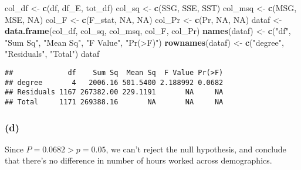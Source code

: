 \documentclass[]{article}
\newenvironment{Shaded}{\begin{snugshade}}{\end{snugshade}}
\newcommand{\KeywordTok}[1]{\textcolor[rgb]{0.13,0.29,0.53}{\textbf{#1}}}
\newcommand{\StringTok}[1]{\textcolor[rgb]{0.31,0.60,0.02}{#1}}
\newcommand{\OtherTok}[1]{\textcolor[rgb]{0.56,0.35,0.01}{#1}}
\newcommand{\NormalTok}[1]{#1}
\begin{document}
\begin{Shaded}
\begin{Highlighting}[]
\NormalTok{col_df <-}\StringTok{ }\KeywordTok{c}\NormalTok{(df, df_E, tot_df)}
\NormalTok{col_sq <-}\StringTok{ }\KeywordTok{c}\NormalTok{(SSG, SSE, SST)}
\NormalTok{col_msq <-}\StringTok{ }\KeywordTok{c}\NormalTok{(MSG, MSE, }\OtherTok{NA}\NormalTok{)}
\NormalTok{col_F <-}\StringTok{ }\KeywordTok{c}\NormalTok{(F_stat, }\OtherTok{NA}\NormalTok{, }\OtherTok{NA}\NormalTok{)}
\NormalTok{col_Pr <-}\StringTok{ }\KeywordTok{c}\NormalTok{(Pr, }\OtherTok{NA}\NormalTok{, }\OtherTok{NA}\NormalTok{)}
\NormalTok{dataf <-}\StringTok{ }\KeywordTok{data.frame}\NormalTok{(col_df, col_sq, col_msq, col_F, col_Pr)}
\KeywordTok{names}\NormalTok{(dataf) <-}\StringTok{ }\KeywordTok{c}\NormalTok{(}\StringTok{"df"}\NormalTok{, }\StringTok{"Sum Sq"}\NormalTok{, }\StringTok{"Mean Sq"}\NormalTok{, }\StringTok{"F Value"}\NormalTok{, }\StringTok{"Pr(>F)"}\NormalTok{)}
\KeywordTok{rownames}\NormalTok{(dataf) <-}\StringTok{ }\KeywordTok{c}\NormalTok{(}\StringTok{"degree"}\NormalTok{, }\StringTok{"Residuals"}\NormalTok{, }\StringTok{"Total"}\NormalTok{)}
\NormalTok{dataf}
\end{Highlighting}
\end{Shaded}

\begin{verbatim}
##             df    Sum Sq  Mean Sq  F Value Pr(>F)
## degree       4   2006.16 501.5400 2.188992 0.0682
## Residuals 1167 267382.00 229.1191       NA     NA
## Total     1171 269388.16       NA       NA     NA
\end{verbatim}

\subsubsection{(d)}\label{d-1}

Since \(P = 0.0682 > p = 0.05\), we can't reject the null hypothesis,
and conclude that there's no difference in number of hours worked across
demographics.
\end{document}
